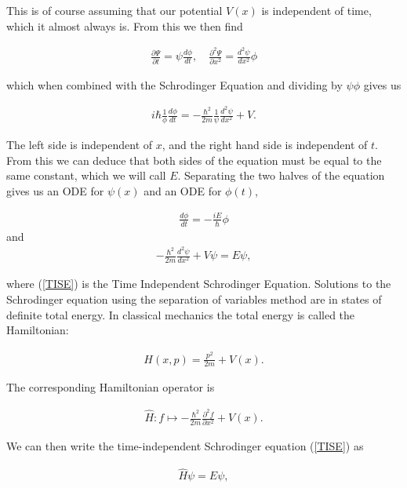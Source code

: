 \documentclass{article}
\begin{document}
\indent This is of course assuming that our potential $V(x)$ is independent of time, which it almost always is. From this we then find

\begin{gather*}
    \frac{\partial \Psi}{\partial t} = \psi \frac{d\phi}{dt}, \quad \frac{\partial^2 \Psi}{\partial x^2} = \frac{d^2 \psi}{dx^2} \phi
\end{gather*}

which when combined with the Schrodinger Equation and dividing by $\psi \phi$ gives us 

\begin{gather*}
   i\hbar \frac{1}{\phi} \frac{d\phi}{dt} = -\frac{\hbar^2}{2m} \frac{1}{\psi} \frac{d^2\psi}{dx^2} + V.
\end{gather*}

The left side is independent of $x$, and the right hand side is independent of $t$. From this we can deduce that both sides of the equation must be equal to the same constant, which we will call $E$. Separating the two halves of the equation gives us an ODE for $\psi(x)$ and an ODE for $\phi(t)$,

\begin{gather*}
    \frac{d \phi}{dt} = -\frac{iE}{\hbar}\phi
\end{gather*}
and
\begin{gather}
    -\frac{\hbar^2}{2m} \frac{d^2 \psi}{dx^2} + V\psi = E \psi,
    \label{TISE}
\end{gather}

\noindent where (\ref{TISE}) is the Time Independent Schrodinger Equation. Solutions to the Schrodinger equation using the separation of variables method are in states of definite total energy. In classical mechanics the total energy is called the Hamiltonian:

\begin{gather*}
    H(x,p) = \frac{p^2}{2m} + V(x).
\end{gather*}

The corresponding Hamiltonian operator is

\begin{gather*}
    \hat{H}: f \mapsto  -\frac{\hbar^2}{2m}\frac{\partial^2 f}{\partial x^2} + V(x).
\end{gather*}

We can then write the time-independent Schrodinger equation (\ref{TISE}) as

\begin{gather*}
    \hat{H} \psi = E \psi,
\end{gather*}
\end{document}
